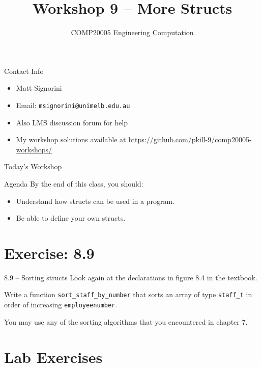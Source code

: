 \documentclass{beamer}
\title{Workshop 9 -- More Structs}
\author{COMP20005 Engineering Computation}
\institute{The University of Melbourne}
\begin{document}
\renewcommand{\tt}[1]{\texttt{#1}}

\begin{frame}
    \titlepage
\end{frame}

\begin{frame}{Contact Info}
    \begin{itemize}
        \item Matt Signorini
        \item Email: \tt{msignorini@unimelb.edu.au}
        \item Also LMS discussion forum for help
        \item My workshop solutions available at \url{https://github.com/pkill-9/comp20005-workshops/}
    \end{itemize}
\end{frame}

\begin{frame}{Today's Workshop}
    \begin{block}{Agenda}
        By the end of this class, you should:
        \begin{itemize}
            \item Understand how structs can be used in a program.
            \item Be able to define your own structs.
        \end{itemize}
    \end{block}
\end{frame}

\section{Exercise: 8.9}

\begin{frame}{8.9 -- Sorting structs}
    Look again at the declarations in figure 8.4 in the textbook.

    Write a function \tt{sort\_staff\_by\_number} that sorts an array of
    type \tt{staff\_t} in order of increasing \tt{employeenumber}.

    You may use any of the sorting algorithms that you encountered in
    chapter 7.
\end{frame}

\section{Lab Exercises}
\end{document}
